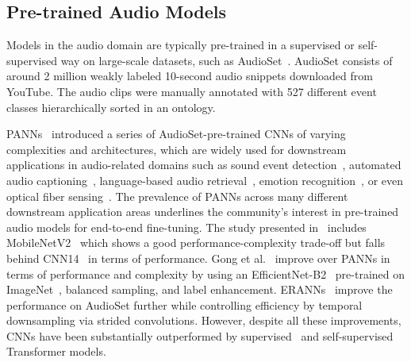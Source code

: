 \documentclass[lettersize,journal]{IEEEtran}
\begin{document}
\subsection{Pre-trained Audio Models}

Models in the audio domain are typically pre-trained in a supervised or self-supervised way on large-scale datasets, such as AudioSet~\cite{audioset2017Gemmeke}. AudioSet consists of around 2 million weakly labeled 10-second audio snippets downloaded from YouTube. The audio clips were manually annotated with 527 different event classes hierarchically sorted in an ontology.

PANNs~\cite{Kong20PANNs} introduced a series of AudioSet-pre-trained CNNs of varying complexities and architectures, which are widely used for downstream applications in audio-related domains such as sound event detection~\cite{Ronchini2022dcase_task4}, automated audio captioning~\cite{mei2022automated}, language-based audio retrieval~\cite{Xie2022dcase_task6b}, emotion recognition~\cite{luna2021multimodal}, or even optical fiber sensing~\cite{Tonami2023optical}. The prevalence of PANNs across many different downstream application areas underlines the community's interest in pre-trained audio models for end-to-end fine-tuning. The study presented in~\cite{Kong20PANNs} includes MobileNetV2~\cite{Sandler18MobileNetsV2} which shows a good performance-complexity trade-off but falls behind CNN14~\cite{Kong20PANNs} in terms of performance. Gong et al.~\cite{Gong21PSLA} improve over PANNs in terms of performance and complexity by using an EfficientNet-B2~\cite{Tan19EfficientNet} pre-trained on ImageNet~\cite{Deng09ImageNet}, balanced sampling, and label enhancement. ERANNs~\cite{Verbitskiy21ERANN} improve the performance on AudioSet further while controlling efficiency by temporal downsampling via strided convolutions. However, despite all these improvements, CNNs have been substantially outperformed by supervised~\cite{Gong21Ast, Koutini21Passt, Chen22HTS-AT, Gong22CMKD} and self-supervised~\cite{Huang22Masked, chen2022beats, Gong2022ssast} Transformer models.
\end{document}
